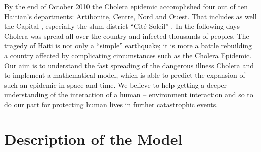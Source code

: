 \documentclass[11pt]{article}
\begin{document}
By the end of October 2010 the Cholera epidemic accomplished four out of ten Haitian’s departments: Artibonite, Centre, Nord and Ouest. That includes as well the Capital , especially the slum district “Cité Soleil” . In the following days Cholera was spread all over the country and infected thousands of peoples. The tragedy of Haiti is not only a “simple” earthquake; it is more a battle rebuilding a country affected by complicating circumstances such as the Cholera Epidemic. 
\newline
Our aim is to understand the fast spreading of the dangerous illness Cholera and to implement a mathematical model, which is able to predict the expansion of such an epidemic in space and time. We believe to help getting a deeper understanding of the interaction of a human – environment interaction and so to do our part for protecting human lives in further catastrophic events.


\section{Description of the Model}
\end{document}

